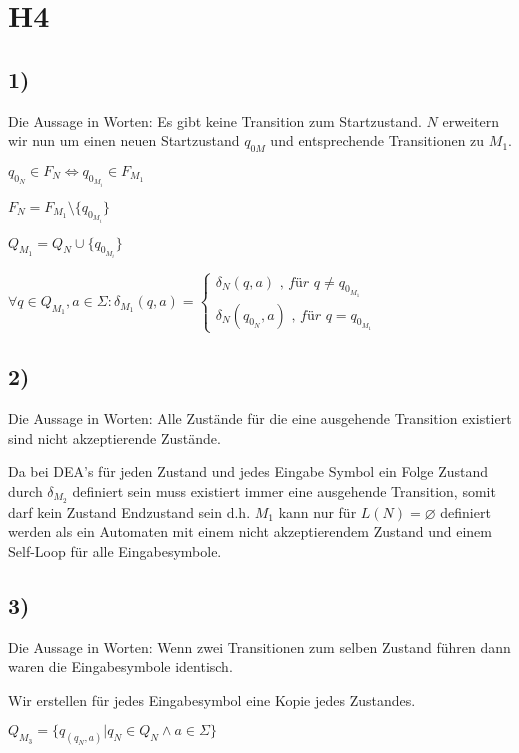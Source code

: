 \section*{H4}

\subsection*{1)}

Die Aussage in Worten: Es gibt keine Transition zum Startzustand.
$N$ erweitern wir nun um einen neuen Startzustand $q_{0M}$ und entsprechende Transitionen zu $M_1$.

$q_{0_N} \in F_N \Leftrightarrow q_{0_{M_i}} \in F_{M_1}$ 

$F_N  =  F_{M_1} \setminus \{q_{0_{M_i}}\}$

$Q_{M_1} = Q_N \cup \{q_{0_{M_i}}\}$

$\forall q \in Q_{M_1}, a \in \Sigma: \delta_{M_1}(q,a) = 
\begin{cases}
\delta_N(q,a) \textit{ , für }q \neq q_{0_{M_1}} \\
\delta_N(q_{0_N},a) \textit{ , für }q = q_{0_{M_1}}
\end{cases}$ 

\subsection*{2)}

Die Aussage in Worten: Alle Zustände für die eine ausgehende Transition existiert sind nicht akzeptierende Zustände.

Da bei DEA's für jeden Zustand und jedes Eingabe Symbol ein Folge Zustand durch $\delta_{M_2}$ definiert sein muss existiert immer eine  ausgehende Transition, somit darf kein Zustand Endzustand sein d.h. $M_1$ kann nur für $L(N) = \varnothing$  definiert werden als ein Automaten mit einem nicht akzeptierendem Zustand und einem Self-Loop für alle Eingabesymbole.


\subsection*{3)}

Die Aussage in Worten: Wenn zwei Transitionen zum selben Zustand führen dann waren die Eingabesymbole identisch.

Wir erstellen für jedes Eingabesymbol eine Kopie jedes Zustandes.

$Q_{M_3} = \{q_{(q_N,a)}|q_N \in Q_N \wedge a \in \Sigma \}$

